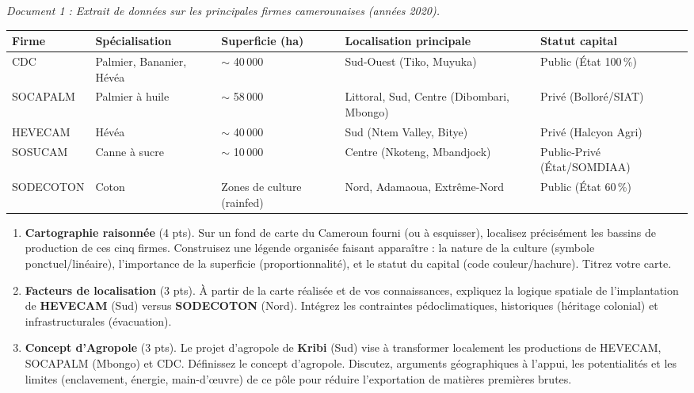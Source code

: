 \documentclass[11pt]{article}
\begin{document}
\begin{exercice}
\emph{Document 1 : Extrait de données sur les principales firmes camerounaises (années 2020).}
\begin{tabularx}{\linewidth}{lXXXX}
\toprule
\textbf{Firme} & \textbf{Spécialisation} & \textbf{Superficie (ha)} & \textbf{Localisation principale} & \textbf{Statut capital} \\
\midrule
CDC & Palmier, Bananier, Hévéa & $\sim$ 40\,000 & Sud-Ouest (Tiko, Muyuka) & Public (État 100\,\%) \\
SOCAPALM & Palmier à huile & $\sim$ 58\,000 & Littoral, Sud, Centre (Dibombari, Mbongo) & Privé (Bolloré/SIAT) \\
HEVECAM & Hévéa & $\sim$ 40\,000 & Sud (Ntem Valley, Bitye) & Privé (Halcyon Agri) \\
SOSUCAM & Canne à sucre & $\sim$ 10\,000 & Centre (Nkoteng, Mbandjock) & Public-Privé (État/SOMDIAA) \\
SODECOTON & Coton & Zones de culture (rainfed) & Nord, Adamaoua, Extrême-Nord & Public (État 60\,\%) \\
\bottomrule
\end{tabularx}

\begin{enumerate}
\item \textbf{Cartographie raisonnée} (4 pts). Sur un fond de carte du Cameroun fourni (ou à esquisser), localisez précisément les bassins de production de ces cinq firmes. Construisez une légende organisée faisant apparaître : la nature de la culture (symbole ponctuel/linéaire), l'importance de la superficie (proportionnalité), et le statut du capital (code couleur/hachure). Titrez votre carte.
\item \textbf{Facteurs de localisation} (3 pts). À partir de la carte réalisée et de vos connaissances, expliquez la logique spatiale de l'implantation de \textbf{HEVECAM} (Sud) versus \textbf{SODECOTON} (Nord). Intégrez les contraintes pédoclimatiques, historiques (héritage colonial) et infrastructurales (évacuation).
\item \textbf{Concept d'Agropole} (3 pts). Le projet d'agropole de \textbf{Kribi} (Sud) vise à transformer localement les productions de HEVECAM, SOCAPALM (Mbongo) et CDC. Définissez le concept d'agropole. Discutez, arguments géographiques à l'appui, les potentialités et les limites (enclavement, énergie, main-d'œuvre) de ce pôle pour réduire l'exportation de matières premières brutes.
\end{enumerate}
\end{exercice}
\end{document}
